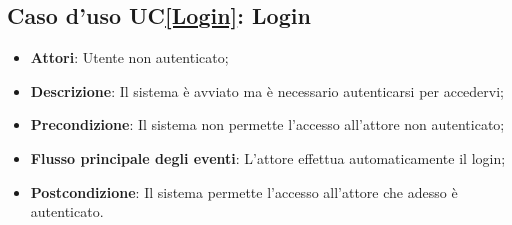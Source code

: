 \subsection{Caso d'uso UC\ref{Login}: Login}
\begin{itemize}
	\item \textbf{Attori}: Utente non autenticato;
	\item \textbf{Descrizione}: Il sistema è avviato ma è necessario autenticarsi per accedervi;
	\item \textbf{Precondizione}: Il sistema non permette l'accesso all'attore non autenticato;
	\item \textbf{Flusso principale degli eventi}: L'attore effettua automaticamente il login;
	\item \textbf{Postcondizione}: Il sistema permette l'accesso all'attore che adesso è autenticato.
\end{itemize}

